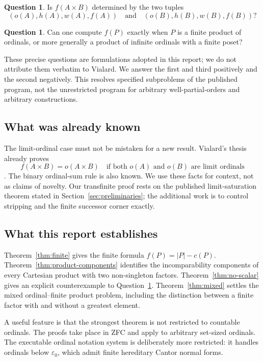 \documentclass[11pt,letterpaper]{article}
\theoremstyle{definition}
\newtheorem{question}[theorem]{Question}
\theoremstyle{remark}
\begin{document}
\begin{question}\label{q:scalar}
Is $f(A\times B)$ determined by the two tuples
\[
 (o(A),h(A),w(A),f(A))\quad\text{and}\quad(o(B),h(B),w(B),f(B))?
\]
\end{question}

\begin{question}\label{q:ordinal}
Can one compute $f(P)$ exactly when $P$ is a finite product of ordinals,
or more generally a product of infinite ordinals with a finite poset?
\end{question}

These precise questions are formulations adopted in this report; we do
not attribute them verbatim to Vialard. We answer the first and third
positively and the second negatively. This resolves specified subproblems
of the published program, not the unrestricted program for arbitrary
well-partial-orders and arbitrary constructions.

\subsection{What was already known}
The limit-ordinal case must not be mistaken for a new result. Vialard's
thesis already proves
\[
 f(A\times B)=o(A\times B)
 \quad\text{if both $o(A)$ and $o(B)$ are limit ordinals}
\]
\cite[Theorem~5.4.8(3)]{VialardThesis}.
The binary ordinal-sum rule is also known. We use these facts for context,
not as claims of novelty. Our transfinite proof rests on the published
limit-saturation theorem stated in Section~\ref{sec:preliminaries}; the
additional work is to control stripping and the finite successor corner
exactly.

\subsection{What this report establishes}
Theorem~\ref{thm:finite} gives the finite formula $f(P)=|P|-c(P)$.
Theorem~\ref{thm:product-components} identifies the incomparability
components of every Cartesian product with two non-singleton factors.
Theorem~\ref{thm:no-scalar} gives an explicit counterexample to
Question~\ref{q:scalar}. Theorem~\ref{thm:mixed} settles the mixed
ordinal--finite product problem, including the distinction between a
finite factor with and without a greatest element.

A useful feature is that the strongest theorem is not restricted to
countable ordinals. The proofs take place in ZFC and apply to arbitrary
set-sized ordinals. The executable ordinal notation system is deliberately
more restricted: it handles ordinals below $\varepsilon_0$, which admit
finite hereditary Cantor normal forms.
\end{document}
